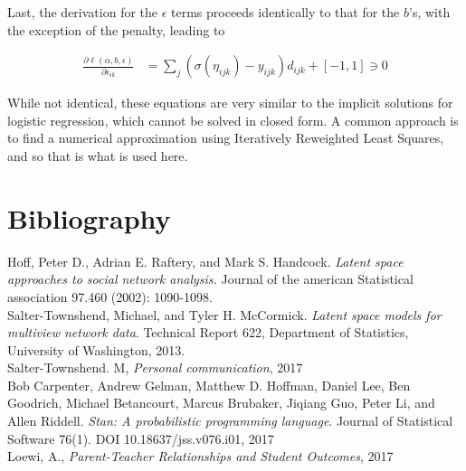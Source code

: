 \documentclass[11pt]{scrartcl}
\begin{document}
Last, the derivation for the $\epsilon$ terms proceeds identically to that for the $b$'s, with the exception of the penalty, leading to

\begin{align}
\frac{\partial \ell(\alpha, b, \epsilon)}{\partial \epsilon_{ik}} &= \sum_{j} (\sigma(\eta_{ijk}) - y_{ijk})d_{ijk} + [-1,1] \ni 0
\end{align}

While not identical, these equations are very similar to the implicit solutions for logistic regression, which cannot be solved in closed form. A common approach is to find a numerical approximation using Iteratively Reweighted Least Squares, and so that is what is used here. 

\section{Bibliography}

Hoff, Peter D., Adrian E. Raftery, and Mark S. Handcock. \textit{Latent space approaches to social network analysis.} Journal of the american Statistical association 97.460 (2002): 1090-1098.\\

Salter-Townshend, Michael, and Tyler H. McCormick. \textit{Latent space models for multiview network data}. Technical Report 622, Department of Statistics, University of Washington, 2013.\\

Salter-Townshend. M, \textit{Personal communication}, 2017\\

Bob Carpenter, Andrew Gelman, Matthew D. Hoffman, Daniel Lee, Ben Goodrich, Michael Betancourt, Marcus Brubaker, Jiqiang Guo, Peter Li, and Allen Riddell. \textit{Stan: A probabilistic programming language}. Journal of Statistical Software 76(1). DOI 10.18637/jss.v076.i01, 2017\\

Loewi, A., \textit{Parent-Teacher Relationships and Student Outcomes}, 2017




\end{document}
